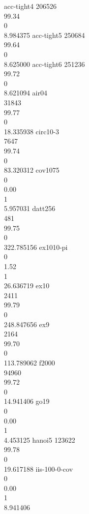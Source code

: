 


acc-tight4 206526 \\ 99.34 \\ 0 \\ 8.984375
acc-tight5 250684 \\ 99.64 \\ 0 \\ 8.625000
acc-tight6 251236 \\ 99.72 \\ 0 \\ 8.621094
air04 \\ 31843 \\ 99.77 \\ 0 \\ 18.335938
circ10-3 \\ 7647 \\ 99.74 \\ 0 \\ 83.320312
cov1075 \\ 0 \\ 0.00 \\ 1 \\ 5.957031
datt256 \\ 481 \\ 99.75 \\ 0 \\ 322.785156
ex1010-pi \\ 0 \\ 1.52 \\ 1 \\ 26.636719
ex10 \\ 2411 \\ 99.79 \\ 0 \\ 248.847656
ex9 \\ 2164 \\ 99.70 \\ 0 \\ 113.789062
f2000 \\ 94960 \\ 99.72 \\ 0 \\ 14.941406
go19 \\ 0 \\ 0.00 \\ 1 \\ 4.453125
hanoi5 123622 \\ 99.78 \\ 0 \\ 19.617188
iis-100-0-cov \\ 0 \\ 0.00 \\ 1 \\ 8.941406
